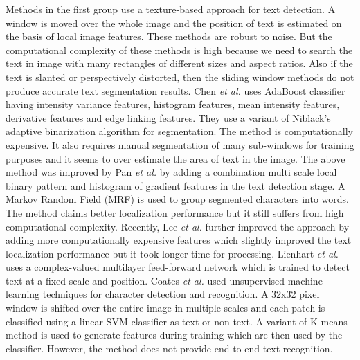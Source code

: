 Methods in the first group \cite{chap2-1, chap2-2, chap2-3}
use a texture-based approach for text detection. A window is moved over the whole image and the position of text is
estimated on the basis of local image features. 
These methods are robust to noise.
But the computational complexity of these methods
is high because we need to search the text in image with many rectangles of different sizes and
aspect ratios. Also if the text is slanted or
perspectively distorted, then the sliding window methods do not produce
accurate text segmentation results.
Chen {\em et al.} \cite{chap2-1}
uses AdaBoost classifier having intensity variance features, histogram features,
mean intensity features, derivative features and edge linking features. 
They use a variant of Niblack's adaptive binarization algorithm for segmentation. 
The method is
computationally expensive. It also
requires manual segmentation of many sub-windows for training purposes and it seems
to over estimate the area of text in the image.
The above method was improved by Pan {\em et al.} \cite{chap2-2}
by adding a combination 
multi scale local binary pattern and histogram of gradient
features in the text detection stage. A Markov Random Field
(MRF) is used to group segmented characters into words. The method claims better localization
performance but it still suffers from high computational complexity.
Recently, Lee {\em et al.} \cite{chap2-3} further improved the approach by adding
more computationally expensive features which slightly improved the text localization performance
but it took longer time for processing.
Lienhart {\em et al.} \cite{chap2-4} uses a complex-valued multilayer feed-forward network 
which is trained to detect text at a fixed scale and position.
Coates {\em et al.} \cite{chap2-5} used unsupervised machine learning techniques
for character detection and recognition. A 32x32 pixel window is
shifted over the entire image in multiple scales and each patch is classified using a
linear SVM classifier as text or non-text. A variant of K-means method is used 
to generate features during training which are then used by the classifier.
However, the method does not provide end-to-end text recognition.

